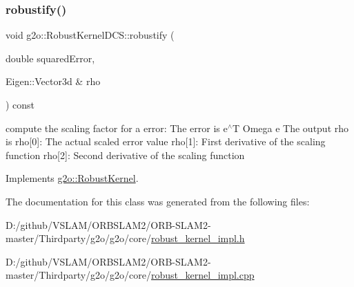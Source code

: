 \subsubsection{\texorpdfstring{robustify()}{robustify()}}
{\footnotesize\ttfamily void g2o\+::\+Robust\+Kernel\+D\+C\+S\+::robustify (\begin{DoxyParamCaption}\item[{double}]{squared\+Error,  }\item[{Eigen\+::\+Vector3d \&}]{rho }\end{DoxyParamCaption}) const\hspace{0.3cm}{\ttfamily [virtual]}}

compute the scaling factor for a error\+: The error is e$^\wedge$T Omega e The output rho is rho\mbox{[}0\mbox{]}\+: The actual scaled error value rho\mbox{[}1\mbox{]}\+: First derivative of the scaling function rho\mbox{[}2\mbox{]}\+: Second derivative of the scaling function 

Implements \mbox{\hyperlink{classg2o_1_1_robust_kernel_ab47b071a0cfe466be063f0104bc41d0f}{g2o\+::\+Robust\+Kernel}}.



The documentation for this class was generated from the following files\+:\begin{DoxyCompactItemize}
\item 
D\+:/github/\+V\+S\+L\+A\+M/\+O\+R\+B\+S\+L\+A\+M2/\+O\+R\+B-\/\+S\+L\+A\+M2-\/master/\+Thirdparty/g2o/g2o/core/\mbox{\hyperlink{robust__kernel__impl_8h}{robust\+\_\+kernel\+\_\+impl.\+h}}\item 
D\+:/github/\+V\+S\+L\+A\+M/\+O\+R\+B\+S\+L\+A\+M2/\+O\+R\+B-\/\+S\+L\+A\+M2-\/master/\+Thirdparty/g2o/g2o/core/\mbox{\hyperlink{robust__kernel__impl_8cpp}{robust\+\_\+kernel\+\_\+impl.\+cpp}}\end{DoxyCompactItemize}
